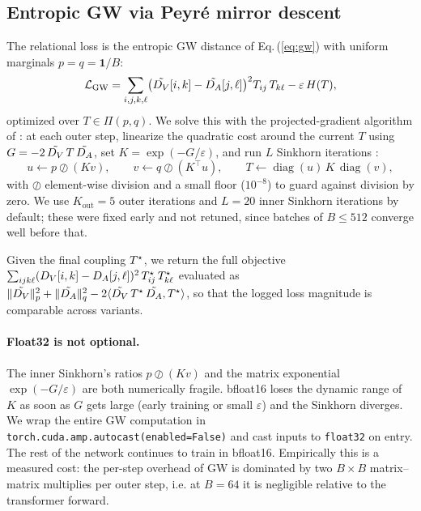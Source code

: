 \subsection{Entropic GW via Peyr\'e mirror descent}
\label{sec:method:gw}
The relational loss is the entropic GW distance of
Eq.\,(\ref{eq:gw}) with uniform marginals $p = q = \mathbf{1}/B$:
\begin{equation}
  \mathcal{L}_{\mathrm{GW}} =
    \sum_{i,j,k,\ell}
    \bigl( \tilde{D_{V}}[i,k] - \tilde{D_{A}}[j,\ell] \bigr)^{2}
    T_{ij}\, T_{k\ell}
    - \varepsilon\, H(T),
\end{equation}
optimized over $T \in \Pi(p, q)$. We solve this with the
projected-gradient algorithm of \citet{peyre2016gromov}: at each
outer step, linearize the quadratic cost around the current $T$
using $G = -2\, \tilde{D_{V}}\, T\, \tilde{D_{A}}$, set
$K = \exp(-G / \varepsilon)$, and run $L$ Sinkhorn iterations
\citep{cuturi2013sinkhorn}:
\begin{equation}
  u \leftarrow p \oslash (K v),
  \qquad
  v \leftarrow q \oslash (K^{\top} u),
  \qquad
  T \leftarrow \operatorname{diag}(u)\, K\, \operatorname{diag}(v),
\end{equation}
with $\oslash$ element-wise division and a small floor
($10^{-8}$) to guard against division by zero. We use $K_{\text{out}}
= 5$ outer iterations and $L = 20$ inner Sinkhorn iterations by
default; these were fixed early and not retuned, since batches of
$B \le 512$ converge well before that.

Given the final coupling $T^{\star}$, we return the full objective
$\sum_{ijk\ell}(D_{V}[i,k] - D_{A}[j,\ell])^2\, T^{\star}_{ij}\,
T^{\star}_{k\ell}$ evaluated as
$\lVert \tilde{D_{V}} \rVert^2_p + \lVert \tilde{D_{A}} \rVert^2_q
- 2 \langle \tilde{D_{V}}\, T^{\star}\, \tilde{D_{A}}, T^{\star} \rangle$, so
that the logged loss magnitude is comparable across variants.

\paragraph{Float32 is not optional.}
The inner Sinkhorn's ratios $p \oslash (K v)$ and the matrix
exponential $\exp(-G/\varepsilon)$ are both numerically fragile.
bfloat16 loses the dynamic range of $K$ as soon as $G$ gets large
(early training or small $\varepsilon$) and the Sinkhorn diverges.
We wrap the entire GW computation in
\texttt{torch.cuda.amp.autocast(enabled=False)} and cast inputs
to \texttt{float32} on entry. The rest of the network continues
to train in bfloat16. Empirically this is a measured cost: the
per-step overhead of GW is dominated by two $B \times B$
matrix--matrix multiplies per outer step, i.e. at $B{=}64$ it is
negligible relative to the transformer forward.

